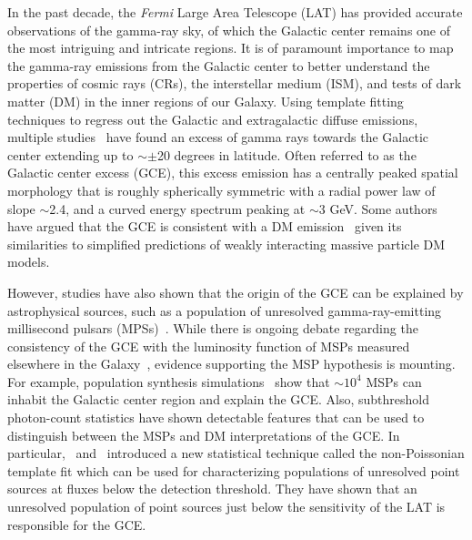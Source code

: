 \documentclass[doublespace,nopageskip]{VTthesis} %
\begin{document}
In the past decade, the \emph{Fermi} Large Area Telescope (LAT) has provided accurate observations of the gamma-ray sky, of which the Galactic center remains one of the most intriguing and intricate regions. It is of paramount importance to map the gamma-ray emissions from the Galactic center to better understand the properties of cosmic rays (CRs), the interstellar medium (ISM), and tests of dark matter (DM) in the inner regions of our Galaxy. Using template fitting techniques to regress out the Galactic and extragalactic diffuse emissions, multiple studies~\cite{2009arXiv0910.2998G,2009arXiv0912.3828V,2011PhLB..697..412H,2012PhRvD..86h3511A,2013PhRvD..88h3521G,2014PhRvD..89f3515M,2013PDU.....2..118H,2014PhRvD..90b3526A,2016PDU....12....1D,2015JCAP...03..038C,2015PhRvD..91l3010Z,2016ApJ...819...44A,2017ApJ...840...43A} have found an excess of gamma rays towards the Galactic center extending up to $\sim\pm$20 degrees in latitude. Often referred to as the Galactic center excess (GCE), this excess emission has a centrally peaked spatial morphology that is roughly spherically symmetric with a radial power law of slope $\sim$2.4, and a curved energy spectrum peaking at $\sim$3 GeV. Some authors have argued that the GCE is consistent with a DM emission~\cite{2009arXiv0910.2998G,2012PhRvD..86h3511A,2013PhRvD..88h3521G,2014PhRvD..89f3515M,2015JCAP...03..038C,2016PDU....12....1D} given its similarities to simplified predictions of weakly interacting massive particle DM models.

However, studies have also shown that the origin of the GCE can be explained by astrophysical sources, such as a population of unresolved gamma-ray-emitting millisecond pulsars (MPSs)~\cite{2011JCAP...03..010A,2012PhRvD..86h3511A,2013PhRvD..88h3521G,2014PhRvD..89f3515M,2015JCAP...03..038C,2016PDU....12....1D}. While there is ongoing debate regarding the consistency of the GCE with the luminosity function of MSPs measured elsewhere in the Galaxy~\cite{2015JCAP...06..043C, 2016JCAP...03..049H, 2017JCAP...08..015P, 2018MNRAS.481.3966B}, evidence supporting the MSP hypothesis is mounting. For example, population synthesis simulations~\cite{2018ApJ...863..199G} show that $\sim 10^4$ MSPs can inhabit the Galactic center region and explain the GCE. Also, subthreshold photon-count statistics have shown detectable features that can be used to distinguish between the MSPs and DM interpretations of the GCE. In particular,~\citet{2016PhRvL.116e1103L} and~\citet{2017AJ....153..253M} introduced a new statistical technique called the non-Poissonian template fit which can be used for characterizing populations of unresolved point sources at fluxes below the detection threshold. They have shown that an unresolved population of point sources just below the sensitivity of the LAT is responsible for the GCE.
\end{document}
